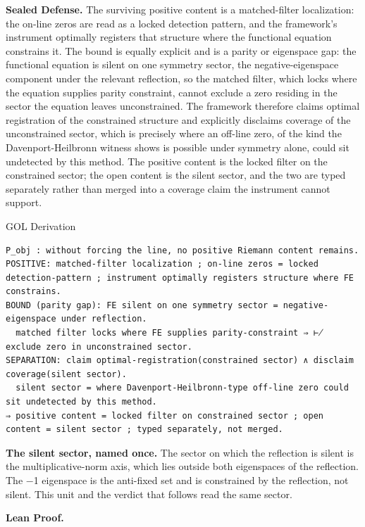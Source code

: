 \documentclass[10pt,twocolumn]{article}
\begin{document}
\textbf{Sealed Defense.} The surviving positive content is a
matched-filter localization: the on-line zeros are read as a locked
detection pattern, and the framework's instrument optimally registers
that structure where the functional equation constrains it. The bound is
equally explicit and is a parity or eigenspace gap: the functional
equation is silent on one symmetry sector, the negative-eigenspace
component under the relevant reflection, so the matched filter, which
locks where the equation supplies parity constraint, cannot exclude a
zero residing in the sector the equation leaves unconstrained. The
framework therefore claims optimal registration of the constrained
structure and explicitly disclaims coverage of the unconstrained sector,
which is precisely where an off-line zero, of the kind the
Davenport-Heilbronn witness shows is possible under symmetry alone,
could sit undetected by this method. The positive content is the locked
filter on the constrained sector; the open content is the silent sector,
and the two are typed separately rather than merged into a coverage
claim the instrument cannot support.

\begin{golbox}{GOL Derivation}
\begin{lstlisting}[style=golv]
P_obj : without forcing the line, no positive Riemann content remains.
POSITIVE: matched-filter localization ; on-line zeros = locked detection-pattern ; instrument optimally registers structure where FE constrains.
BOUND (parity gap): FE silent on one symmetry sector = negative-eigenspace under reflection.
  matched filter locks where FE supplies parity-constraint ⇒ ⊬ exclude zero in unconstrained sector.
SEPARATION: claim optimal-registration(constrained sector) ∧ disclaim coverage(silent sector).
  silent sector = where Davenport-Heilbronn-type off-line zero could sit undetected by this method.
⇒ positive content = locked filter on constrained sector ; open content = silent sector ; typed separately, not merged.
\end{lstlisting}
\end{golbox}

\textbf{The silent sector, named once.} The sector on which the
reflection is silent is the multiplicative-norm axis, which lies outside
both eigenspaces of the reflection. The −1 eigenspace is the anti-fixed
set and is constrained by the reflection, not silent. This unit and the
verdict that follows read the same sector.

\textbf{Lean Proof.}
\end{document}
